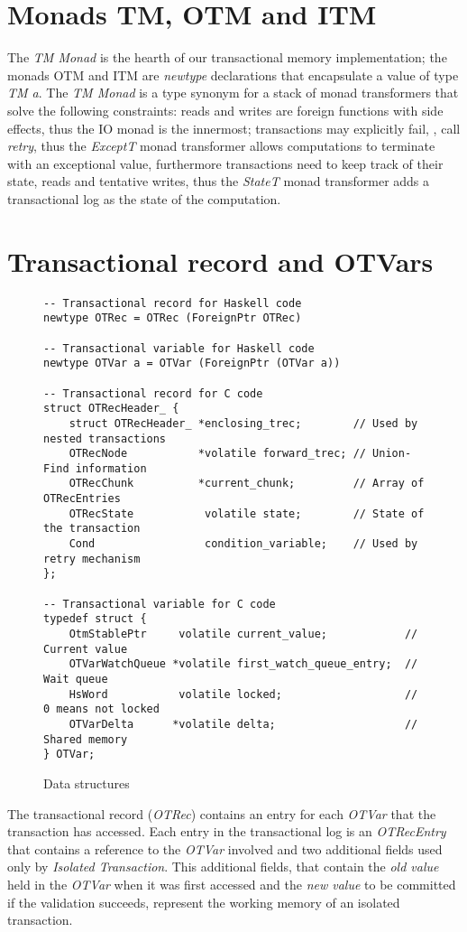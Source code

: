 \section{Monads TM, OTM and ITM}
The \emph{TM Monad} is the hearth of our transactional memory implementation;
the monads OTM and ITM are \emph{newtype} declarations that encapsulate a value of type \emph{TM a}.
The \emph{TM Monad} is a type synonym for a stack of monad transformers that solve the following constraints:
reads and writes are foreign functions with side effects, thus the IO monad is the innermost;
transactions may explicitly fail, \ie, call \emph{retry}, thus the \emph{ExceptT} monad transformer allows computations to terminate with an exceptional value,
furthermore transactions need to keep track of their state, reads and tentative writes, thus the \emph{StateT} monad transformer adds a transactional log as the state of the computation.

\section{Transactional record and OTVars}
\begin{figure}[t]
\begin{lstlisting}
-- Transactional record for Haskell code
newtype OTRec = OTRec (ForeignPtr OTRec)

-- Transactional variable for Haskell code
newtype OTVar a = OTVar (ForeignPtr (OTVar a))

-- Transactional record for C code
struct OTRecHeader_ {
    struct OTRecHeader_ *enclosing_trec;        // Used by nested transactions
    OTRecNode           *volatile forward_trec; // Union-Find information
    OTRecChunk          *current_chunk;         // Array of OTRecEntries
    OTRecState           volatile state;        // State of the transaction
    Cond                 condition_variable;    // Used by retry mechanism
};

-- Transactional variable for C code
typedef struct {
    OtmStablePtr     volatile current_value;            // Current value
    OTVarWatchQueue *volatile first_watch_queue_entry;  // Wait queue
    HsWord           volatile locked;                   // 0 means not locked
    OTVarDelta      *volatile delta;                    // Shared memory
} OTVar;
\end{lstlisting}
\caption{Data structures}
\end{figure}
The transactional record (\emph{OTRec}) contains an entry for each \emph{OTVar} that the transaction has accessed.
Each entry in the transactional log is an \emph{OTRecEntry} that contains a reference to the \emph{OTVar} involved and two additional fields used only by \emph{Isolated Transaction}.
This additional fields, that contain the \emph{old value} held in the \emph{OTVar} when it was first accessed and the \emph{new value} to be committed if the validation succeeds, represent the working memory of an isolated transaction.


